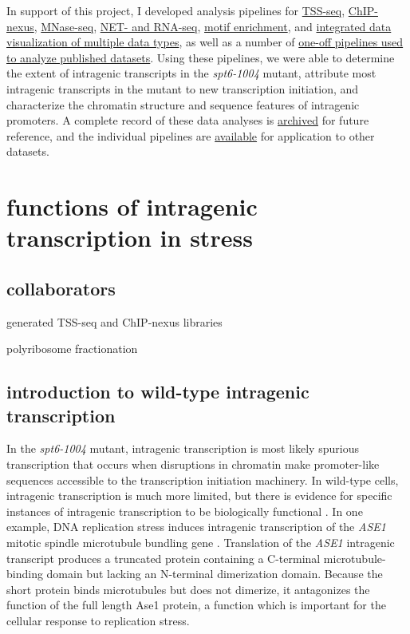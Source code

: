 \documentclass[9pt, letterpaper]{article}
\begin{document}
In support of this project, I developed analysis pipelines for \href{https://github.com/winston-lab/tss-seq}{TSS-seq}, \href{https://github.com/winston-lab/chip-nexus}{ChIP-nexus}, \href{https://github.com/winston-lab/mnase-seq}{MNase-seq}, \href{https://github.com/winston-lab/net-and-rna-seq}{NET- and RNA-seq}, \href{https://github.com/winston-lab/motif-enrichment}{motif enrichment}, and \href{https://github.com/winston-lab/integrated-datavis}{integrated data visualization of multiple data types}, as well as a number of \href{https://github.com/winston-lab}{one-off pipelines used to analyze published datasets}. Using these pipelines, we were able to determine the extent of intragenic transcripts in the \textit{spt6-1004} mutant, attribute most intragenic transcripts in the mutant to new transcription initiation, and characterize the chromatin structure and sequence features of intragenic promoters. A complete record of these data analyses is \href{https://doi.org/10.5281/zenodo.1409826}{archived} for future reference, and the individual pipelines are \href{https://github.com/winston-lab}{available} for application to other datasets.

\newpage
\section{functions of intragenic transcription in stress}

\subsection{collaborators}

\begin{description}[align=right, labelwidth=5cm, noitemsep]
    \item [Steve Doris] generated TSS-seq and ChIP-nexus libraries
    \item [Dan Spatt] polyribosome fractionation
\end{description}

\subsection{introduction to wild-type intragenic transcription}

In the \textit{spt6-1004} mutant, intragenic transcription is most likely spurious transcription that occurs when disruptions in chromatin make promoter-like sequences accessible to the transcription initiation machinery. In wild-type cells, intragenic transcription is much more limited, but there is evidence for specific instances of intragenic transcription to be biologically functional \cite{mcknight2014, gammie1999}. In one example, DNA replication stress induces intragenic transcription of the \textit{ASE1} mitotic spindle microtubule bundling gene \cite{mcknight2014}. Translation of the \textit{ASE1} intragenic transcript produces a truncated protein containing a C-terminal microtubule-binding domain but lacking an N-terminal dimerization domain. Because the short protein binds microtubules but does not dimerize, it antagonizes the function of the full length Ase1 protein, a function which is important for the cellular response to replication stress.
\end{document}
